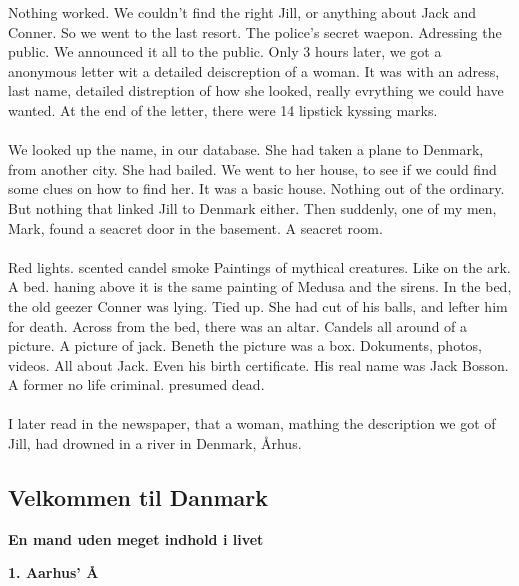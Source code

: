 \documentclass[]{article}
\begin{document}
Nothing worked. We couldn't find the right Jill, or anything about Jack and Conner. So we went to the last resort. The police's secret waepon. Adressing the public. We announced it all to the public. Only 3 hours later, we got a anonymous letter wit a detailed deiscreption of a woman. It was with an adress, last name, detailed distreption of how she looked, really evrything we could have wanted. At the end of the letter, there were 14 lipstick kyssing marks.
\\ \\
We looked up the name, in our database. She had taken a plane to Denmark, from another city. She had bailed. We went to her house, to see if we could find some clues on how to find her. It was a basic house. Nothing out of the ordinary. But nothing that linked Jill to Denmark either. Then suddenly, one of my men, Mark, found a seacret door in the basement. A seacret room. 
\\ \\
Red lights. scented candel smoke Paintings of mythical creatures. Like on the ark. A bed. haning above it is the same painting of Medusa and the sirens. In the bed, the old geezer Conner was lying. Tied up. She had cut of his balls, and lefter him for death. Across from the bed, there was an altar. Candels all around of a picture. A picture of jack. Beneth the picture was a box. Dokuments, photos, videos. All about Jack. Even his birth certificate. His real name was Jack Bosson. A former no life criminal. presumed dead.  
\\ \\
I later read in the newspaper, that a woman, mathing the description we got of Jill, had drowned in a river in Denmark, Århus.

\newpage

\begin{center}
	\section{Velkommen til Danmark}
\end{center}

\begin{center}
	\Large\textbf{En mand uden meget indhold i livet}
\end{center}

\begin{center}
	\large\textbf{1. Aarhus’ Å}
\end{center}
\end{document}
